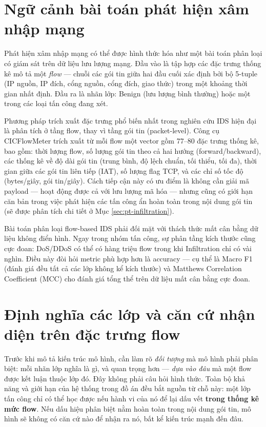 \documentclass[../DoAn.tex]{subfiles}
\begin{document}
\section{Ngữ cảnh bài toán phát hiện xâm nhập mạng}
\label{sec:ngu-canh}

Phát hiện xâm nhập mạng có thể được hình thức hóa như một bài toán phân loại có giám sát trên dữ liệu lưu lượng mạng. Đầu vào là tập hợp các đặc trưng thống kê mô tả một \textit{flow} --- chuỗi các gói tin giữa hai đầu cuối xác định bởi bộ 5-tuple (IP nguồn, IP đích, cổng nguồn, cổng đích, giao thức) trong một khoảng thời gian nhất định. Đầu ra là nhãn lớp: Benign (lưu lượng bình thường) hoặc một trong các loại tấn công đang xét.

Phương pháp trích xuất đặc trưng phổ biến nhất trong nghiên cứu IDS hiện đại là phân tích ở tầng flow, thay vì tầng gói tin (packet-level). Công cụ CICFlowMeter \cite{lashkari2017} trích xuất từ mỗi flow một vector gồm 77--80 đặc trưng thống kê, bao gồm: thời lượng flow, số lượng gói tin theo cả hai hướng (forward/backward), các thống kê về độ dài gói tin (trung bình, độ lệch chuẩn, tối thiểu, tối đa), thời gian giữa các gói tin liên tiếp (IAT), số lượng flag TCP, và các chỉ số tốc độ (bytes/giây, gói tin/giây). Cách tiếp cận này có ưu điểm là không cần giải mã payload --- hoạt động được cả với lưu lượng mã hóa --- nhưng cũng có giới hạn căn bản trong việc phát hiện các tấn công ẩn hoàn toàn trong nội dung gói tin (sẽ được phân tích chi tiết ở Mục \ref{sec:pt-infiltration}).

Bài toán phân loại flow-based IDS phải đối mặt với thách thức mất cân bằng dữ liệu không điển hình. Ngay trong nhóm tấn công, sự phân tầng kích thước cũng cực đoan: DoS/DDoS có thể có hàng triệu flow trong khi Infiltration chỉ có vài nghìn. Điều này đòi hỏi metric phù hợp hơn là accuracy --- cụ thể là Macro F1 (đánh giá đều tất cả các lớp không kể kích thước) và Matthews Correlation Coefficient (MCC) cho đánh giá tổng thể trên dữ liệu mất cân bằng cực đoan.

\section{Định nghĩa các lớp và căn cứ nhận diện trên đặc trưng flow}
\label{sec:dinh-nghia-lop}

Trước khi mô tả kiến trúc mô hình, cần làm rõ \textit{đối tượng} mà mô hình phải phân biệt: mỗi nhãn lớp nghĩa là gì, và quan trọng hơn --- \textit{dựa vào đâu} mà một flow được kết luận thuộc lớp đó. Đây không phải câu hỏi hình thức. Toàn bộ khả năng và giới hạn của hệ thống trong đồ án đều bắt nguồn từ chỗ này: một lớp tấn công chỉ có thể học được nếu hành vi của nó để lại dấu vết \textbf{trong thống kê mức flow}. Nếu dấu hiệu phân biệt nằm hoàn toàn trong nội dung gói tin, mô hình sẽ không có căn cứ nào để nhận ra nó, bất kể kiến trúc mạnh đến đâu.
\end{document}
